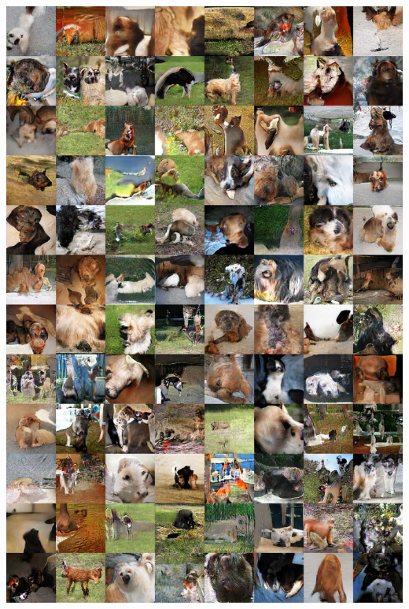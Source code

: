 \documentclass{article}
\begin{document}
\includegraphics[width=1.0\textwidth]{Figs/sup/dogs.jpg}\\
\end{document}
